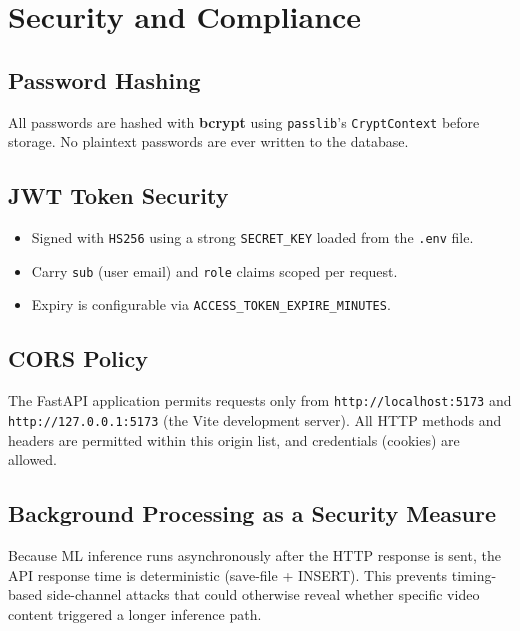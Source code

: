 \documentclass[12pt,a4paper]{article}
\begin{document}
\section{Security and Compliance}
\label{sec:security}

\subsection{Password Hashing}

All passwords are hashed with \textbf{bcrypt} using \texttt{passlib}'s
\texttt{CryptContext} before storage. No plaintext passwords are ever written
to the database.

\subsection{JWT Token Security}

\begin{itemize}[leftmargin=1.5em]
  \item Signed with \texttt{HS256} using a strong \texttt{SECRET\_KEY}
        loaded from the \texttt{.env} file.
  \item Carry \texttt{sub} (user email) and \texttt{role} claims scoped
        per request.
  \item Expiry is configurable via \texttt{ACCESS\_TOKEN\_EXPIRE\_MINUTES}.
\end{itemize}

\subsection{CORS Policy}

The FastAPI application permits requests only from
\texttt{http://localhost:5173} and \texttt{http://127.0.0.1:5173}
(the Vite development server). All HTTP methods and headers are permitted
within this origin list, and credentials (cookies) are allowed.

\subsection{Background Processing as a Security Measure}

Because ML inference runs asynchronously after the HTTP response is sent,
the API response time is deterministic (save-file + INSERT). This prevents
timing-based side-channel attacks that could otherwise reveal whether
specific video content triggered a longer inference path.
\end{document}
